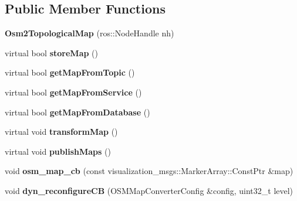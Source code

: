 \subsection*{Public Member Functions}
\begin{DoxyCompactItemize}
\item 
\mbox{\label{classgr__map__utils_1_1Osm2TopologicalMap_a4312fea9491b7e04f52f237f165db97d}} 
{\bfseries Osm2\+Topological\+Map} (ros\+::\+Node\+Handle nh)
\item 
\mbox{\label{classgr__map__utils_1_1Osm2TopologicalMap_a6cbcd1c5bb8ee339ea159f6a78ba014c}} 
virtual bool {\bfseries store\+Map} ()
\item 
\mbox{\label{classgr__map__utils_1_1Osm2TopologicalMap_a252dc6d41ded06a158d4fa77efad3a79}} 
virtual bool {\bfseries get\+Map\+From\+Topic} ()
\item 
\mbox{\label{classgr__map__utils_1_1Osm2TopologicalMap_a00e019b8428b1408f23dc4fab8f76386}} 
virtual bool {\bfseries get\+Map\+From\+Service} ()
\item 
\mbox{\label{classgr__map__utils_1_1Osm2TopologicalMap_aaadd039386e4e006bc239fa7b443139d}} 
virtual bool {\bfseries get\+Map\+From\+Database} ()
\item 
\mbox{\label{classgr__map__utils_1_1Osm2TopologicalMap_a176b71421b4853584522282a271c54c0}} 
virtual void {\bfseries transform\+Map} ()
\item 
\mbox{\label{classgr__map__utils_1_1Osm2TopologicalMap_ac8c8cc2a60a3a7ffe3786292da0e1cfb}} 
virtual void {\bfseries publish\+Maps} ()
\item 
\mbox{\label{classgr__map__utils_1_1Osm2TopologicalMap_abb4ae72db1cf25b2f3b2f9cc29d4a5ac}} 
void {\bfseries osm\+\_\+map\+\_\+cb} (const visualization\+\_\+msgs\+::\+Marker\+Array\+::\+Const\+Ptr \&map)
\item 
\mbox{\label{classgr__map__utils_1_1Osm2TopologicalMap_ab20fa6386acdbf7f6e802a941943eb89}} 
void {\bfseries dyn\+\_\+reconfigure\+CB} (O\+S\+M\+Map\+Converter\+Config \&config, uint32\+\_\+t level)
\end{DoxyCompactItemize}
